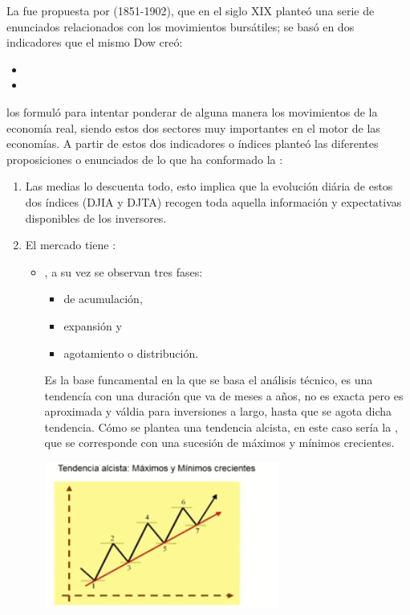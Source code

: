 La  fue propuesta por  (1851-1902), que en el siglo XIX planteó una serie de enunciados relacionados con los movimientos bursátiles; se basó en dos indicadores que el mismo Dow creó:
\begin{itemize}
    \item {}
    \item {}
\end{itemize}
los formuló para intentar ponderar de alguna manera los movimientos de la economía real, siendo estos dos sectores muy importantes en el motor de las economías. A partir de estos dos indicadores o índices planteó las diferentes proposiciones o enunciados de lo que ha conformado la :

\begin{enumerate}
    \item Las medias lo descuenta todo, esto implica que la evolución diária de estos dos índices (DJIA y DJTA) recogen toda aquella información y expectativas disponibles de los inversores.
    \item El mercado tiene :
    \begin{itemize}
        \item {}, a su vez se observan tres fases:
        \begin{itemize}
            \item de acumulación,
            \item expansión y 
            \item agotamiento o distribución.
        \end{itemize}
        Es la base funcamental en la que se basa el análisis técnico, es una tendencía con una duración que va de meses a años, no es exacta pero es aproximada y váldia para inversiones a largo, hasta que se agota dicha tendencia.
        Cómo se plantea una tendencia alcista, en este caso sería la , que se corresponde con una sucesión de máximos y mínimos crecientes.
        \begin{center}
            \includegraphics[scale=.80]{images/tendencia-alcista.png}

\end{center}
\end{itemize}
\end{enumerate}
